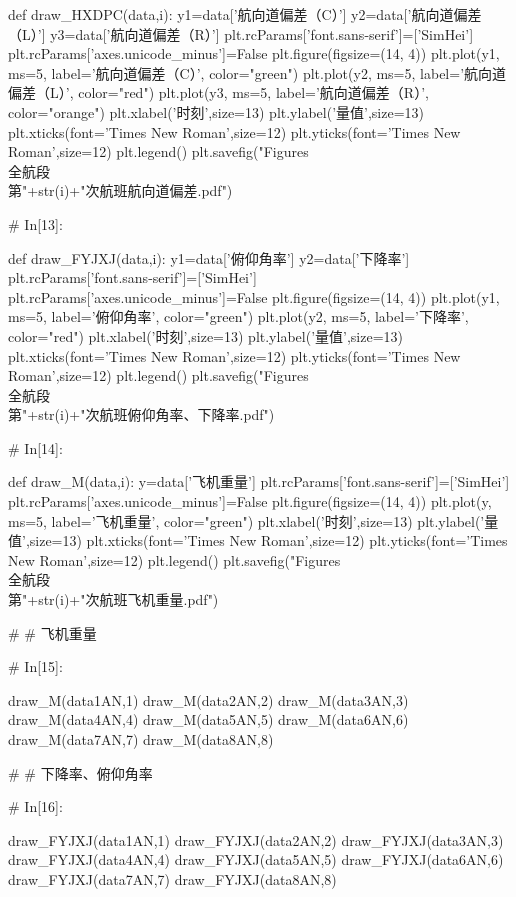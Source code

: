 \documentclass{MathorCupModeling}
\begin{document}
\begin{python}
def draw_HXDPC(data,i):
    y1=data['航向道偏差（C）']
    y2=data['航向道偏差（L）']
    y3=data['航向道偏差（R）']
    plt.rcParams['font.sans-serif']=['SimHei']
    plt.rcParams['axes.unicode_minus']=False
    plt.figure(figsize=(14, 4))
    plt.plot(y1, ms=5, label='航向道偏差（C）', color="green")
    plt.plot(y2, ms=5, label='航向道偏差（L）', color="red")
    plt.plot(y3, ms=5, label='航向道偏差（R）', color="orange")
    plt.xlabel('时刻',size=13)
    plt.ylabel('量值',size=13)
    plt.xticks(font='Times New Roman',size=12)
    plt.yticks(font='Times New Roman',size=12)
    plt.legend()
    plt.savefig("Figures\\全航段\\第"+str(i)+"次航班航向道偏差.pdf")


# In[13]:


def draw_FYJXJ(data,i):
    y1=data['俯仰角率']
    y2=data['下降率']
    plt.rcParams['font.sans-serif']=['SimHei']
    plt.rcParams['axes.unicode_minus']=False
    plt.figure(figsize=(14, 4))
    plt.plot(y1, ms=5, label='俯仰角率', color="green")
    plt.plot(y2, ms=5, label='下降率', color="red")
    plt.xlabel('时刻',size=13)
    plt.ylabel('量值',size=13)
    plt.xticks(font='Times New Roman',size=12)
    plt.yticks(font='Times New Roman',size=12)
    plt.legend()
    plt.savefig("Figures\\全航段\\第"+str(i)+"次航班俯仰角率、下降率.pdf")


# In[14]:


def draw_M(data,i):
    y=data['飞机重量']
    plt.rcParams['font.sans-serif']=['SimHei']
    plt.rcParams['axes.unicode_minus']=False
    plt.figure(figsize=(14, 4))
    plt.plot(y, ms=5, label='飞机重量', color="green")
    plt.xlabel('时刻',size=13)
    plt.ylabel('量值',size=13)
    plt.xticks(font='Times New Roman',size=12)
    plt.yticks(font='Times New Roman',size=12)
    plt.legend()
    plt.savefig("Figures\\全航段\\第"+str(i)+"次航班飞机重量.pdf")


# # 飞机重量

# In[15]:


draw_M(data1AN,1)
draw_M(data2AN,2)
draw_M(data3AN,3)
draw_M(data4AN,4)
draw_M(data5AN,5)
draw_M(data6AN,6)
draw_M(data7AN,7)
draw_M(data8AN,8)


# # 下降率、俯仰角率

# In[16]:


draw_FYJXJ(data1AN,1)
draw_FYJXJ(data2AN,2)
draw_FYJXJ(data3AN,3)
draw_FYJXJ(data4AN,4)
draw_FYJXJ(data5AN,5)
draw_FYJXJ(data6AN,6)
draw_FYJXJ(data7AN,7)
draw_FYJXJ(data8AN,8)



\end{python}
\end{document}
